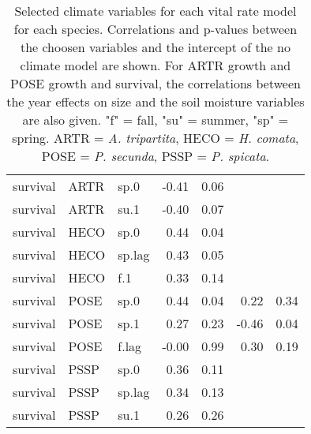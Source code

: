 \documentclass[11pt]{article}
\begin{document}
\begin{table}[ht]
\begin{tabular}{lllrrrr}
		survival & ARTR & sp.0 & -0.41 & 0.06 &  &  \\ 
		survival & ARTR & su.1 & -0.40 & 0.07 &  &  \\ 
		survival & HECO & sp.0 & 0.44 & 0.04 &  &  \\ 
		survival & HECO & sp.lag & 0.43 & 0.05 &  &  \\ 
		survival & HECO & f.1 & 0.33 & 0.14 &  &  \\ 
		survival & POSE & sp.0 & 0.44 & 0.04 & 0.22 & 0.34 \\ 
		survival & POSE & sp.1 & 0.27 & 0.23 & -0.46 & 0.04 \\ 
		survival & POSE & f.lag & -0.00 & 0.99 & 0.30 & 0.19 \\ 
		survival & PSSP & sp.0 & 0.36 & 0.11 &  &  \\ 
		survival & PSSP & sp.lag & 0.34 & 0.13 &  &  \\ 
		survival & PSSP & su.1 & 0.26 & 0.26 &  &  \\ 
		\hline
	\end{tabular}
	\caption{Selected climate variables for each vital rate model for each species. Correlations and p-values between the choosen variables and the intercept of the no climate model are shown. For ARTR growth and POSE growth and survival, the correlations between the year effects on size and the soil moisture variables are also given. "f" = fall, "su" = summer, "sp" = spring. ARTR = \textit{A. tripartita}, HECO = \textit{H. comata}, POSE = \textit{P. secunda}, PSSP = \textit{P. spicata}.} 
	\label{table:strongCor}
\end{table}
\end{document}
